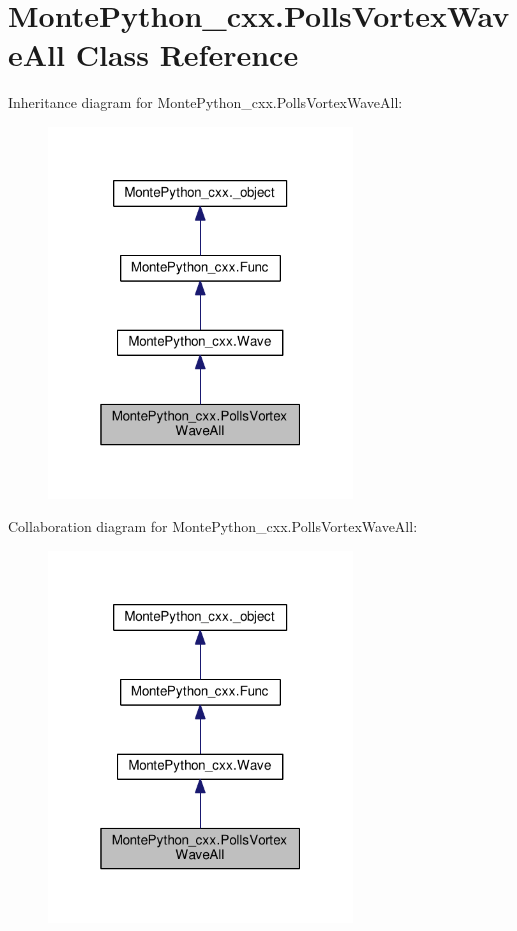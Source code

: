 \hypertarget{classMontePython__cxx_1_1PollsVortexWaveAll}{}\section{Monte\+Python\+\_\+cxx.\+Polls\+Vortex\+Wave\+All Class Reference}
\label{classMontePython__cxx_1_1PollsVortexWaveAll}


Inheritance diagram for Monte\+Python\+\_\+cxx.\+Polls\+Vortex\+Wave\+All\+:
\nopagebreak
\begin{figure}[H]
\begin{center}
\leavevmode
\includegraphics[width=229pt]{classMontePython__cxx_1_1PollsVortexWaveAll__inherit__graph}
\end{center}
\end{figure}


Collaboration diagram for Monte\+Python\+\_\+cxx.\+Polls\+Vortex\+Wave\+All\+:
\nopagebreak
\begin{figure}[H]
\begin{center}
\leavevmode
\includegraphics[width=229pt]{classMontePython__cxx_1_1PollsVortexWaveAll__coll__graph}
\end{center}
\end{figure}
